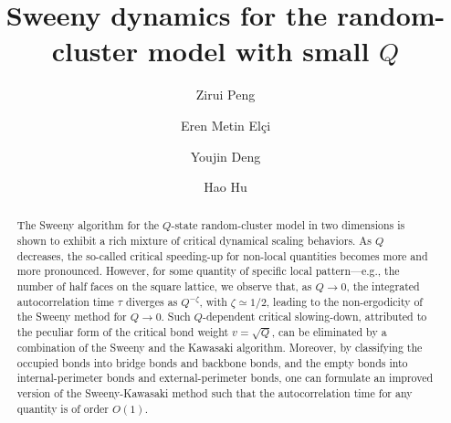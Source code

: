 \documentclass[aps,pre,twocolumn,superscriptaddress,longbibliography,floatfix]{revtex4-2}
\begin{document}
\title{Sweeny dynamics for the random-cluster model with small $Q$}

\author{Zirui Peng }

\author{Eren Metin Elçi}
\author{Youjin Deng}
\author{Hao Hu}

\begin{abstract}
The Sweeny algorithm for the $Q$-state random-cluster model in two dimensions is shown to exhibit a rich mixture of critical dynamical scaling behaviors. As $Q$ decreases, the so-called critical speeding-up for non-local quantities becomes more and more pronounced. However, for some quantity of specific local pattern---e.g., the number of half faces on the square lattice, we observe that, as $Q \to 0$, the integrated autocorrelation time $\tau$ diverges as $Q^{-\zeta}$, with $\zeta \simeq 1/2$, leading to the non-ergodicity of the Sweeny method for $Q \to 0$. Such $Q$-dependent critical slowing-down, attributed to the peculiar form of the critical bond weight $v=\sqrt{Q}$, can be eliminated by a combination of the Sweeny and the Kawasaki algorithm. Moreover, by classifying the occupied bonds into bridge bonds and backbone bonds, and the empty bonds into internal-perimeter bonds and external-perimeter bonds, one can formulate an improved version of the Sweeny-Kawasaki method such that the autocorrelation time for any quantity is of order $O(1)$. 
\end{abstract}
\maketitle
\end{document}
